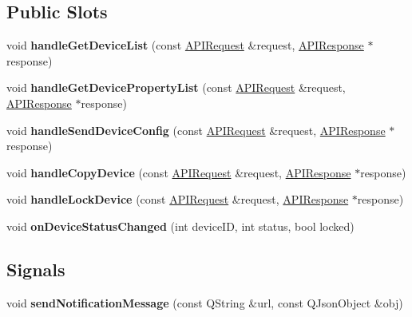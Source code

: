 \subsection*{Public Slots}
\begin{DoxyCompactItemize}
\item 
\mbox{\label{class_a_p_i_device_a1e74a10d605557654fe5be02a9db87ab}} 
void {\bfseries handle\+Get\+Device\+List} (const \hyperlink{class_a_p_i_request}{A\+P\+I\+Request} \&request, \hyperlink{class_a_p_i_response}{A\+P\+I\+Response} $\ast$response)
\item 
\mbox{\label{class_a_p_i_device_a5be87488af611d8ef61501a07e4a39d9}} 
void {\bfseries handle\+Get\+Device\+Property\+List} (const \hyperlink{class_a_p_i_request}{A\+P\+I\+Request} \&request, \hyperlink{class_a_p_i_response}{A\+P\+I\+Response} $\ast$response)
\item 
\mbox{\label{class_a_p_i_device_a794458df71d6f24a8b8dccbbdf9235da}} 
void {\bfseries handle\+Send\+Device\+Config} (const \hyperlink{class_a_p_i_request}{A\+P\+I\+Request} \&request, \hyperlink{class_a_p_i_response}{A\+P\+I\+Response} $\ast$response)
\item 
\mbox{\label{class_a_p_i_device_ab3151ab616a5ae04f1aa157d24e8f511}} 
void {\bfseries handle\+Copy\+Device} (const \hyperlink{class_a_p_i_request}{A\+P\+I\+Request} \&request, \hyperlink{class_a_p_i_response}{A\+P\+I\+Response} $\ast$response)
\item 
\mbox{\label{class_a_p_i_device_a9fa95a9f88e738477ed5e32e22ae6990}} 
void {\bfseries handle\+Lock\+Device} (const \hyperlink{class_a_p_i_request}{A\+P\+I\+Request} \&request, \hyperlink{class_a_p_i_response}{A\+P\+I\+Response} $\ast$response)
\item 
\mbox{\label{class_a_p_i_device_a4424a0e2b44177c7b3af3b9fd9aca875}} 
void {\bfseries on\+Device\+Status\+Changed} (int device\+ID, int status, bool locked)
\end{DoxyCompactItemize}
\subsection*{Signals}
\begin{DoxyCompactItemize}
\item 
\mbox{\label{class_a_p_i_device_a1096381146a1c545b194d4bb63b32b8b}} 
void {\bfseries send\+Notification\+Message} (const Q\+String \&url, const Q\+Json\+Object \&obj)
\end{DoxyCompactItemize}
